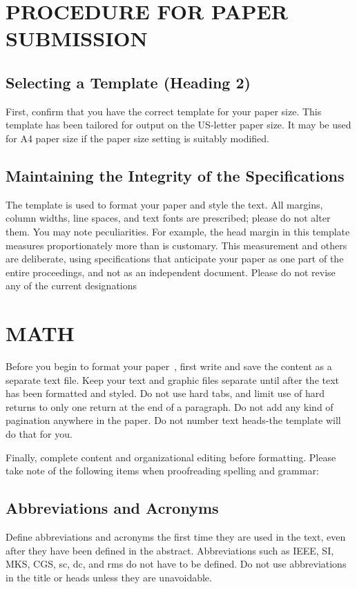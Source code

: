 \documentclass[letterpaper, 10 pt, conference]{ieeeconf}  %
\begin{document}
{{\section{PROCEDURE FOR PAPER SUBMISSION}

\subsection{Selecting a Template (Heading 2)}

First, confirm that you have the correct template for your paper size. This template has been tailored for output on the US-letter paper size. 
It may be used for A4 paper size if the paper size setting is suitably modified.

\subsection{Maintaining the Integrity of the Specifications}

The template is used to format your paper and style the text. All margins, column widths, line spaces, and text fonts are prescribed; please do not alter them. You may note peculiarities. For example, the head margin in this template measures proportionately more than is customary. This measurement and others are deliberate, using specifications that anticipate your paper as one part of the entire proceedings, and not as an independent document. Please do not revise any of the current designations

\section{MATH}

Before you begin to format your paper~\cite{phillips2011sipp}, first write and save the content as a separate text file. Keep your text and graphic files separate until after the text has been formatted and styled. Do not use hard tabs, and limit use of hard returns to only one return at the end of a paragraph. Do not add any kind of pagination anywhere in the paper. Do not number text heads-the template will do that for you.

Finally, complete content and organizational editing before formatting. Please take note of the following items when proofreading spelling and grammar:

\subsection{Abbreviations and Acronyms} Define abbreviations and acronyms the first time they are used in the text, even after they have been defined in the abstract. Abbreviations such as IEEE, SI, MKS, CGS, sc, dc, and rms do not have to be defined. Do not use abbreviations in the title or heads unless they are unavoidable.

}}
\end{document}
